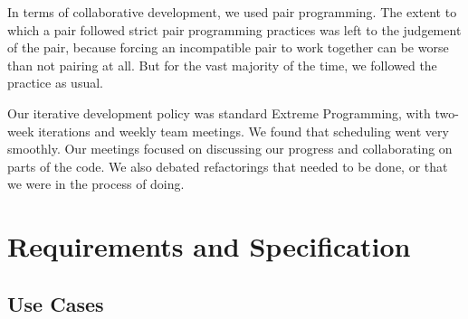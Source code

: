 \documentclass{hitec}
\begin{document}
In terms of collaborative development, we used pair programming.  The extent to which a pair followed strict pair programming practices was left to the judgement of the pair, because forcing an incompatible pair to work together can be worse than not pairing at all.  But for the vast majority of the time, we followed the practice as usual. 
     
Our iterative development policy was standard Extreme Programming, with two-week iterations and weekly team meetings.  We found that scheduling went very smoothly.  Our meetings focused on discussing our progress and collaborating on parts of the code.  We also debated refactorings that needed to be done, or that we were in the process of doing.
\section{Requirements and Specification}
\subsection{Use Cases}
\end{document}
